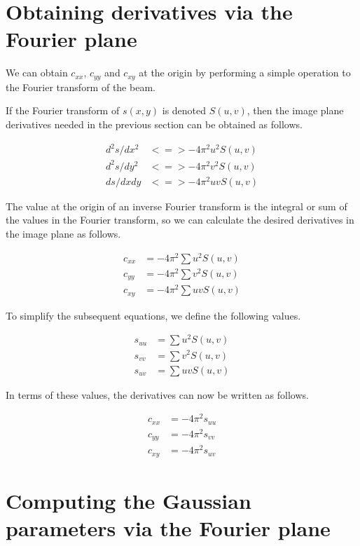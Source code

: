 \documentclass[11pt]{article}
\newcommand{\cxx}{c_{xx}}
\newcommand{\cyy}{c_{yy}}
\newcommand{\cxy}{c_{xy}}
\newcommand{\suu}{s_{uu}}
\newcommand{\svv}{s_{vv}}
\newcommand{\suv}{s_{uv}}
\begin{document}
\section{Obtaining derivatives via the Fourier plane}

We can obtain $\cxx$, $\cyy$ and $\cxy$ at the origin by performing a simple
operation to the Fourier transform of the beam.

If the Fourier transform of $s(x,y)$ is denoted $S(u,v)$, then the
image plane derivatives needed in the previous section can be obtained
as follows.

\begin{align}
  d^2s/dx^2 &<=> -4\pi^2  u^2  S(u,v)\\
  d^2s/dy^2 &<=> -4\pi^2  v^2  S(u,v)\\
  ds/dxdy &<=> -4\pi^2 u v  S(u,v)
\end{align}

The value at the origin of an inverse Fourier transform is the
integral or sum of the values in the Fourier transform, so we can
calculate the desired derivatives in the image plane as follows.

\begin{align}
  \cxx &= -4 \pi^2  \sum{u^2  S(u,v)} \\
  \cyy &= -4 \pi^2  \sum{v^2  S(u,v)} \\
  \cxy &= -4 \pi^2  \sum{u v  S(u,v)}
\end{align}

To simplify the subsequent equations, we define the following values.

\begin{align}
  \suu &= \sum{u^2  S(u,v)} \\
  \svv &= \sum{v^2  S(u,v)} \\
  \suv &= \sum{u v  S(u,v)}
\end{align}

In terms of these values, the derivatives can now be written as
follows.

\begin{align}
\label{cxx_uv_eqn}
  \cxx &= -4\pi^2  \suu \\
\label{cyy_uv_eqn}
  \cyy &= -4\pi^2  \svv \\
\label{cxy_uv_eqn}
  \cxy &= -4\pi^2  \suv
\end{align}

\section{Computing the Gaussian parameters via the Fourier plane}
\end{document}
